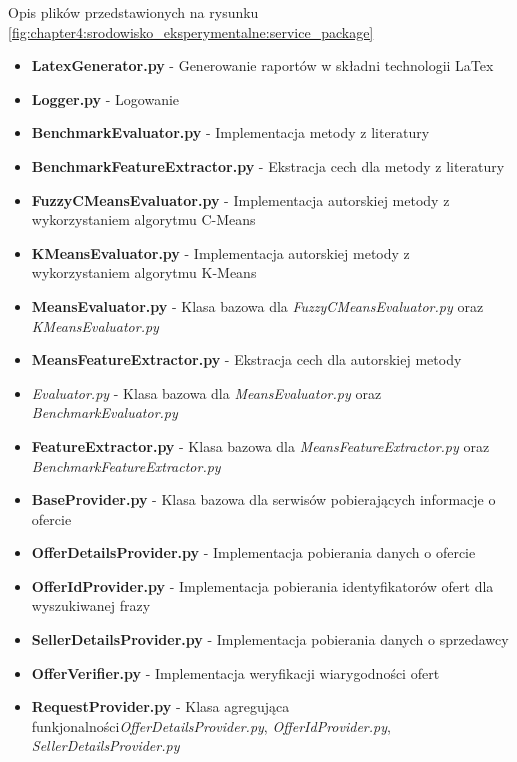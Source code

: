 \documentclass[../Kamil_Kowalewski_Main.tex]{subfiles}
\begin{document}
{{{            Opis plików przedstawionych na rysunku
            \ref{fig:chapter4:srodowisko_eksperymentalne:service_package}
            \begin{itemize}[noitemsep,topsep=1pt]
                \item \textbf{LatexGenerator.py} - Generowanie raportów w składni technologii LaTex
                \item \textbf{Logger.py} - Logowanie
                \item \textbf{BenchmarkEvaluator.py} - Implementacja metody z literatury
                \item \textbf{BenchmarkFeatureExtractor.py} - Ekstracja cech dla metody z literatury
                \item \textbf{FuzzyCMeansEvaluator.py} - Implementacja autorskiej metody z wykorzystaniem algorytmu C-Means
                \item \textbf{KMeansEvaluator.py} - Implementacja autorskiej metody z wykorzystaniem algorytmu K-Means
                \item \textbf{MeansEvaluator.py} - Klasa bazowa dla \textit{FuzzyCMeansEvaluator.py} oraz \textit{KMeansEvaluator.py}
                \item \textbf{MeansFeatureExtractor.py} - Ekstracja cech dla autorskiej metody
                \item \textit{Evaluator.py} - Klasa bazowa dla \textit{MeansEvaluator.py} oraz \textit{BenchmarkEvaluator.py}
                \item \textbf{FeatureExtractor.py} - Klasa bazowa dla \textit{MeansFeatureExtractor.py} oraz \textit{BenchmarkFeatureExtractor.py}
                \item \textbf{BaseProvider.py} - Klasa bazowa dla serwisów pobierających informacje o ofercie
                \item \textbf{OfferDetailsProvider.py} - Implementacja pobierania danych o ofercie
                \item \textbf{OfferIdProvider.py} - Implementacja pobierania identyfikatorów ofert dla wyszukiwanej frazy
                \item \textbf{SellerDetailsProvider.py} - Implementacja pobierania danych o sprzedawcy
                \item \textbf{OfferVerifier.py} - Implementacja weryfikacji wiarygodności ofert
                \item \textbf{RequestProvider.py} - Klasa agregująca funkjonalności\textit{OfferDetailsProvider.py}, \textit{OfferIdProvider.py}, \textit{SellerDetailsProvider.py}
            \end{itemize}

}}}
\end{document}

